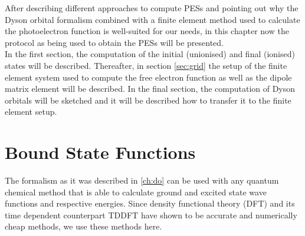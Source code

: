 After describing different approaches to compute PESs and pointing out why the Dyson orbital formalism combined with a finite element method used to calculate the photoelectron function is well-suited for our needs, in this chapter now
the protocol as being used to obtain the PESs will be presented.\\
In the first section, the computation of the initial (unionised) and final (ionised) states will be described.
Thereafter, in section \ref{sec:grid} the setup of the finite element system used to compute the free electron function as well as the dipole matrix element will be described.
In the final section, the computation of Dyson orbitals will be sketched and it will be described how to transfer it to the finite element setup.

\section{Bound State Functions}
The formalism as it was described in \ref{ch:do} can be used with any quantum chemical method that is able to calculate ground and excited state wave functions and respective energies.
Since density functional theory (DFT) and its time dependent counterpart TDDFT have shown to be accurate and numerically cheap methods, we use these methods here.


